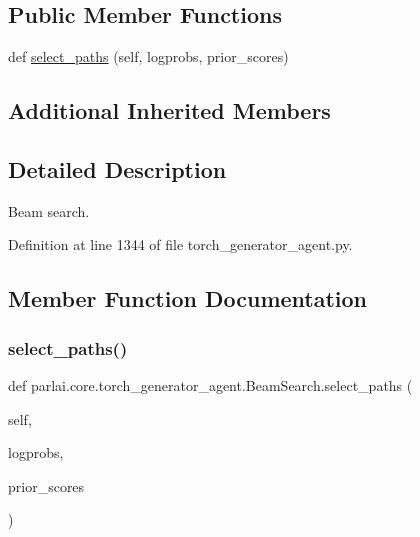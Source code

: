 \subsection*{Public Member Functions}
\begin{DoxyCompactItemize}
\item 
def \hyperlink{classparlai_1_1core_1_1torch__generator__agent_1_1BeamSearch_a3d67c12c987514ad263418ca2d98bbba}{select\+\_\+paths} (self, logprobs, prior\+\_\+scores)
\end{DoxyCompactItemize}
\subsection*{Additional Inherited Members}


\subsection{Detailed Description}
\begin{DoxyVerb}Beam search.
\end{DoxyVerb}
 

Definition at line 1344 of file torch\+\_\+generator\+\_\+agent.\+py.



\subsection{Member Function Documentation}
\mbox{\label{classparlai_1_1core_1_1torch__generator__agent_1_1BeamSearch_a3d67c12c987514ad263418ca2d98bbba}} 
\subsubsection{\texorpdfstring{select\+\_\+paths()}{select\_paths()}}
{\footnotesize\ttfamily def parlai.\+core.\+torch\+\_\+generator\+\_\+agent.\+Beam\+Search.\+select\+\_\+paths (\begin{DoxyParamCaption}\item[{}]{self,  }\item[{}]{logprobs,  }\item[{}]{prior\+\_\+scores }\end{DoxyParamCaption})}

